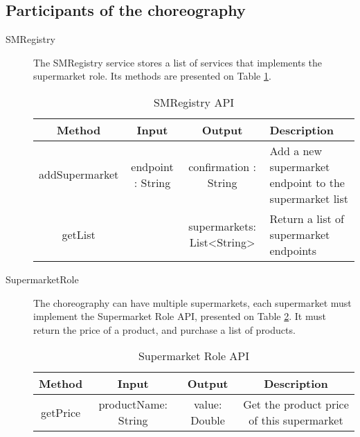 \subsection{Participants of the choreography}
\begin{description}

\item[SMRegistry] The SMRegistry service stores a list of services that implements the supermarket role. Its methods are presented on Table \ref{smregistryapi}.
	\begin{table}[htdp]
	\caption{SMRegistry API}
	\begin{center}
	\begin{tabular}{|c|c|c|m{4cm}|}
		\hline
		Method & Input & Output & Description \\ \hline
		addSupermarket & endpoint : String & confirmation : String & Add a new supermarket endpoint to the supermarket list \\ \hline
		getList & & supermarkets: List<String> & Return a list of supermarket endpoints \\ \hline
	\end{tabular}
	\end{center}
	\label{smregistryapi}
	\end{table}%

\item[SupermarketRole] The choreography can have multiple supermarkets, each supermarket must implement the Supermarket Role API, presented on Table \ref{smroleapi}. It must return the price of a product, and purchase a list of products.
	\begin{table}[htdp]
	\caption{Supermarket Role API}
	\begin{center}
	\begin{tabular}{|c|c|c|c|}
		\hline
		Method	& Input				& Output 			& Description \\ \hline
		getPrice 	& productName: String	& value: Double	& Get the product price of this supermarket \\ \hline
	\end{tabular}
	\end{center}
	\label{smroleapi}
	\end{table}%


\end{description}
